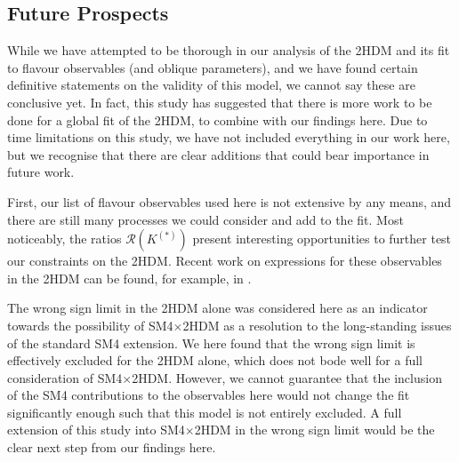 \documentclass[a4paper,12pt]{article}
\begin{document}
\subsection{Future Prospects}
While we have attempted to be thorough in our analysis of the 2HDM and its fit to flavour observables (and oblique parameters), and we have found certain definitive statements on the validity of this model, we cannot say these are conclusive yet. 
In fact, this study has suggested that there is more work to be done for a global fit of the 2HDM, to combine with our findings here.
Due to time limitations on this study, we have not included everything in our work here, but we recognise that there are clear additions that could bear importance in future work. 

First, our list of flavour observables used here is not extensive by any means, and there are still many processes we could consider and add to the fit. 
Most noticeably, the ratios $\mathcal{R}(K^{(*)})$ present interesting opportunities to further test our constraints on the 2HDM. 
Recent work on expressions for these observables in the 2HDM can be found, for example, in \cite{criv}. 

The wrong sign limit in the 2HDM alone was considered here as an indicator towards the possibility of SM4$\times$2HDM as a resolution to the long-standing issues of the standard SM4 extension. 
We here found that the wrong sign limit is effectively excluded for the 2HDM alone, which does not bode well for a full consideration of SM4$\times$2HDM. 
However, we cannot guarantee that the inclusion of the SM4 contributions to the observables here would not change the fit significantly enough such that this model is not entirely excluded. 
A full extension of this study into SM4$\times$2HDM in the wrong sign limit would be the clear next step from our findings here.
\end{document}
